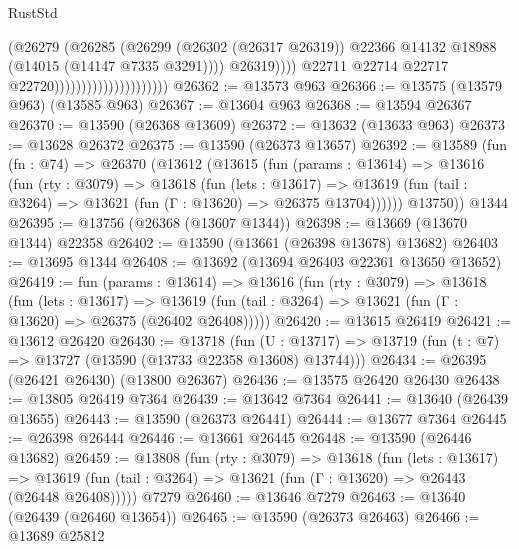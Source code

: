 \begin{lexlean}{RustStd}
\begin{coremodule}
                                                    (@26279
                                                      (@26285
                                                        (@26299
                                                          (@26302 (@26317 @26319))
                                                          @22366
                                                          @14132
                                                          @18988
                                                          (@14015 (@14147 @7335 @3291))))
                                                      @26319))))
                                              @22711
                                              @22714
                                              @22717
                                              @22720)))))))))))))))))))))
@26362 := @13573 @963
@26366 := @13575 (@13579 @963) (@13585 @963)
@26367 := @13604 @963
@26368 := @13594 @26367
@26370 := @13590 (@26368 @13609)
@26372 := @13632 (@13633 @963)
@26373 := @13628 @26372
@26375 := @13590 (@26373 @13657)
@26392 := @13589
    (fun (fn : @74) =>
    @26370
      (@13612
        (@13615
          (fun (params : @13614) =>
          @13616
            (fun (rty : @3079) =>
            @13618
              (fun (lets : @13617) =>
              @13619 (fun (tail : @3264) => @13621 (fun (Γ : @13620) => @26375 @13704))))))
        @13750))
    @1344
@26395 := @13756 (@26368 (@13607 @1344))
@26398 := @13669 (@13670 @1344) @22358
@26402 := @13590 (@13661 (@26398 @13678) @13682)
@26403 := @13695 @1344
@26408 := @13692 (@13694 @26403 @22361 @13650 @13652)
@26419 := fun (params : @13614) =>
  @13616
    (fun (rty : @3079) =>
    @13618
      (fun (lets : @13617) =>
      @13619 (fun (tail : @3264) => @13621 (fun (Γ : @13620) => @26375 (@26402 @26408)))))
@26420 := @13615 @26419
@26421 := @13612 @26420
@26430 := @13718
    (fun (U : @13717) => @13719 (fun (t : @7) => @13727 (@13590 (@13733 @22358 @13608) @13744)))
@26434 := @26395 (@26421 @26430) (@13800 @26367)
@26436 := @13575 @26420 @26430
@26438 := @13805 @26419 @7364
@26439 := @13642 @7364
@26441 := @13640 (@26439 @13655)
@26443 := @13590 (@26373 @26441)
@26444 := @13677 @7364
@26445 := @26398 @26444
@26446 := @13661 @26445
@26448 := @13590 (@26446 @13682)
@26459 := @13808
    (fun (rty : @3079) =>
    @13618
      (fun (lets : @13617) =>
      @13619 (fun (tail : @3264) => @13621 (fun (Γ : @13620) => @26443 (@26448 @26408)))))
    @7279
@26460 := @13646 @7279
@26463 := @13640 (@26439 (@26460 @13654))
@26465 := @13590 (@26373 @26463)
@26466 := @13689 @25812

\end{coremodule}
\end{lexlean}
